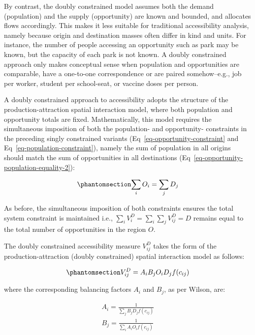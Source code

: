 \documentclass[
  10pt,
  letterpaper,
]{article}
\begin{document}
By contrast, the doubly constrained model assumes both the demand
(population) and the supply (opportunity) are known and bounded, and
allocates flows accordingly. This makes it less suitable for traditional
accessibility analysis, namely because origin and destination masses
often differ in kind and units. For instance, the number of people
accessing an opportunity such as park may be known, but the capacity of
each park is not known. A doubly constrained approach only makes
conceptual sense when population and opportunities are comparable, have
a one-to-one correspondence or are paired somehow--e.g., job per worker,
student per school-seat, or vaccine doses per person.

A doubly constrained approach to accessibility adopts the structure of
the production-attraction spatial interaction model, where both
population and opportunity totals are fixed. Mathematically, this model
requires the simultaneous imposition of both the population- and
opportunity- constraints in the preceding singly constrained variants
(Eq~\ref{eq-opportunity-constraint} and
Eq~\ref{eq-population-constraint}), namely the sum of population in all
origins should match the sum of opportunities in all destinations
(Eq~\ref{eq-opportunity-population-equality-2}):

\begin{equation}\phantomsection\label{eq-opportunity-population-equality-2}{
\sum_i O_i = \sum_j D_j
}\end{equation}

As before, the simultaneous imposition of both constraints ensures the
total system constraint is maintained i.e.,
\(\sum_i V^D_{i} = \sum_i\sum_j  V^D_{ij} = D\) remains equal to the
total number of opportunities in the region \(O\).

The doubly constrained accessibility measure \(V_{ij}^D\) takes the form
of the production-attraction (doubly constrained) spatial interaction
model as follows:

\begin{equation}\phantomsection\label{eq-doubly-constrained-accessibility}{
V_{ij}^D = A_i B_j O_i D_j f(c_{ij})
}\end{equation}

\noindent where the corresponding balancing factors \(A_i\) and \(B_j\),
as per Wilson, are:

\[
\begin{array}{l}
A_i = \frac{1}{\sum_j B_j D_j f(c_{ij})}\\
B_j = \frac{1}{\sum_i A_i O_i f(c_{ij})}
\end{array}
\]
\end{document}
